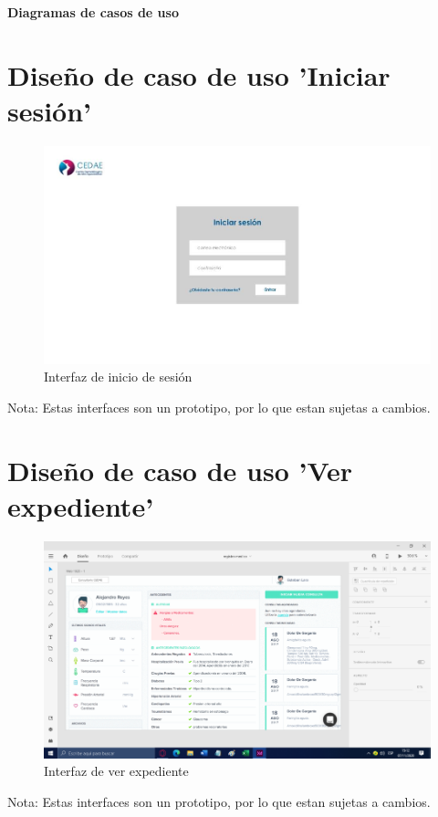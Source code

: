 \documentclass[12pt,letterpaper]{article}
\begin{document}
	{
		\begin{center}
			\par\vspace{0.5cm}
			{
				\Huge\textbf
				{
					Diagramas de casos de uso
				}
			}
        \end{center}
    \section{Diseño de caso de uso 'Iniciar sesión'}
        \begin{figure}[H]
            \centering
            \includegraphics [scale=0.4]{mockupIniciarSesion}
            \caption{Interfaz de inicio de sesión}
        \end{figure}
        Nota: Estas interfaces son un prototipo, por lo que estan sujetas a cambios.
    \section{Diseño de caso de uso 'Ver expediente'}
        \begin{figure}[H]
            \centering
            \includegraphics [scale=0.4]{mockupExpediente}
            \caption{Interfaz de ver expediente}
        \end{figure}
        Nota: Estas interfaces son un prototipo, por lo que estan sujetas a cambios.
        \vfill
    }
\end{document}

